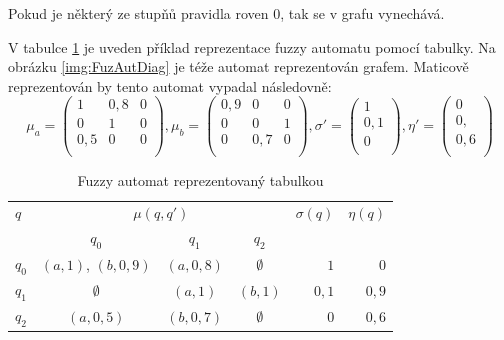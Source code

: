 \documentclass[a4paper,10pt]{article}
\begin{document}
Pokud je některý ze stupňů pravidla roven $0$, tak se v grafu vynechává.

\begin{example} \label{ex:FuzAut}
  V tabulce \ref{tab:FuzAutTab} je uveden příklad reprezentace fuzzy automatu pomocí tabulky. Na obrázku \ref{img:FuzAutDiag} je téže automat reprezentován grafem. Maticově reprezentován by tento automat vypadal následovně:
  $$
  \mu_a = 
    \begin{pmatrix}
     1 		& 0{,}8 	& 0 \\
     0 		& 1 		& 0 \\
     0{,}5 	& 0		& 0 \\
    \end{pmatrix},
  \mu_b = 
    \begin{pmatrix}
     0{,}9 	& 0	 	& 0 \\
     0 		& 0 		& 1 \\
     0	 	& 0{,}7		& 0 \\
    \end{pmatrix},
  \sigma' = 
    \begin{pmatrix}
     1 		\\
     0{,}1 	\\
     0		\\
    \end{pmatrix},
  \eta' = 
    \begin{pmatrix}
     0 		\\
     0{,} 	\\
     0{,}6	\\
    \end{pmatrix}
  $$
\end{example}

\begin{table}
 \centering
  \begin{tabular}{|l||c|c|c||r|r|}
    \hline
    $q$		& \multicolumn{3}{c||}{$\mu(q, q')$} 				& $\sigma(q)$ 	& $\eta(q)$	\\
    ~		& $q_0$ 			& $q_1$ 	& $q_2$ 	& ~  		& ~		\\ \hline \hline
    $q_0$ 	& $(a, 1)$, $(b, 0{,}9)$ 	& $(a, 0{,}8)$ 	& $\emptyset$ 	& $1$ 		& $0$		\\ \hline
    $q_1$ 	& $\emptyset$ 			& $(a, 1)$ 	& $(b, 1)$ 	& $0{,}1$ 	& $0{,}9$	\\ \hline
    $q_2$ 	& $(a, 0{,}5)$ 			& $(b, 0{,}7)$ 	& $\emptyset$ 	& $0$ 		& $0{,}6$	\\ \hline
  \end{tabular}

 \caption{Fuzzy automat reprezentovaný tabulkou} \label{tab:FuzAutTab}
\end{table}
\end{document}
